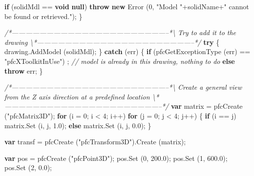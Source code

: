\documentclass[]{article}
\newenvironment{Shaded}{}{}
\newcommand{\KeywordTok}[1]{\textcolor[rgb]{0.00,0.44,0.13}{\textbf{{#1}}}}
\newcommand{\DecValTok}[1]{\textcolor[rgb]{0.25,0.63,0.44}{{#1}}}
\newcommand{\FloatTok}[1]{\textcolor[rgb]{0.25,0.63,0.44}{{#1}}}
\newcommand{\StringTok}[1]{\textcolor[rgb]{0.25,0.44,0.63}{{#1}}}
\newcommand{\CommentTok}[1]{\textcolor[rgb]{0.38,0.63,0.69}{\textit{{#1}}}}
\newcommand{\OtherTok}[1]{\textcolor[rgb]{0.00,0.44,0.13}{{#1}}}
\newcommand{\FunctionTok}[1]{\textcolor[rgb]{0.02,0.16,0.49}{{#1}}}
\newcommand{\NormalTok}[1]{{#1}}
\begin{document}
\begin{Shaded}
\begin{Highlighting}[]
      \KeywordTok{if} \NormalTok{(solidMdl == }\KeywordTok{void} \KeywordTok{null}\NormalTok{)}
    \KeywordTok{throw} \KeywordTok{new} \FunctionTok{Error} \NormalTok{(}\DecValTok{0}\NormalTok{, }
             \StringTok{"Model "}\NormalTok{+solidName+}\StringTok{" cannot be found or retrieved."}\NormalTok{);}
    \NormalTok{\}}
        
\CommentTok{/*--------------------------------------------------------------------*\textbackslash{}     }
\CommentTok{  Try to add it to the drawing}
\CommentTok{\textbackslash{}*--------------------------------------------------------------------*/}    
  \KeywordTok{try}
    \NormalTok{\{ }
      \OtherTok{drawing}\NormalTok{.}\FunctionTok{AddModel} \NormalTok{(solidMdl);}
    \NormalTok{\}}
  \KeywordTok{catch} \NormalTok{(err)}
    \NormalTok{\{}
      \KeywordTok{if} \NormalTok{(}\FunctionTok{pfcGetExceptionType} \NormalTok{(err) == }\StringTok{"pfcXToolkitInUse"}\NormalTok{)}
    \NormalTok{; }\CommentTok{// model is already in this drawing, nothing to do}
      \KeywordTok{else}
    \KeywordTok{throw} \NormalTok{err;}
    \NormalTok{\}}
  
\CommentTok{/*--------------------------------------------------------------------*\textbackslash{} }
\CommentTok{  Create a general view from the Z axis direction at a predefined location }
\CommentTok{\textbackslash{}*--------------------------------------------------------------------*/} 
  \KeywordTok{var} \NormalTok{matrix = }\FunctionTok{pfcCreate} \NormalTok{(}\StringTok{"pfcMatrix3D"}\NormalTok{);}
  \KeywordTok{for} \NormalTok{(i = }\DecValTok{0}\NormalTok{; i < }\DecValTok{4}\NormalTok{; i++)}
    \KeywordTok{for} \NormalTok{(j = }\DecValTok{0}\NormalTok{; j < }\DecValTok{4}\NormalTok{; j++)}
      \NormalTok{\{}
    \KeywordTok{if} \NormalTok{(i == j)}
      \OtherTok{matrix}\NormalTok{.}\FunctionTok{Set} \NormalTok{(i, j, }\FloatTok{1.0}\NormalTok{);}
    \KeywordTok{else}
      \OtherTok{matrix}\NormalTok{.}\FunctionTok{Set} \NormalTok{(i, j, }\FloatTok{0.0}\NormalTok{);}
      \NormalTok{\}}
  
  \KeywordTok{var} \NormalTok{transf = }\FunctionTok{pfcCreate} \NormalTok{(}\StringTok{"pfcTransform3D"}\NormalTok{).}\FunctionTok{Create} \NormalTok{(matrix);}
  
  \KeywordTok{var} \NormalTok{pos = }\FunctionTok{pfcCreate} \NormalTok{(}\StringTok{"pfcPoint3D"}\NormalTok{);}
  \OtherTok{pos}\NormalTok{.}\FunctionTok{Set} \NormalTok{(}\DecValTok{0}\NormalTok{, }\FloatTok{200.0}\NormalTok{);}
  \OtherTok{pos}\NormalTok{.}\FunctionTok{Set} \NormalTok{(}\DecValTok{1}\NormalTok{, }\FloatTok{600.0}\NormalTok{);}
  \OtherTok{pos}\NormalTok{.}\FunctionTok{Set} \NormalTok{(}\DecValTok{2}\NormalTok{, }\FloatTok{0.0}\NormalTok{);}
  

\end{Highlighting}
\end{Shaded}
\end{document}
